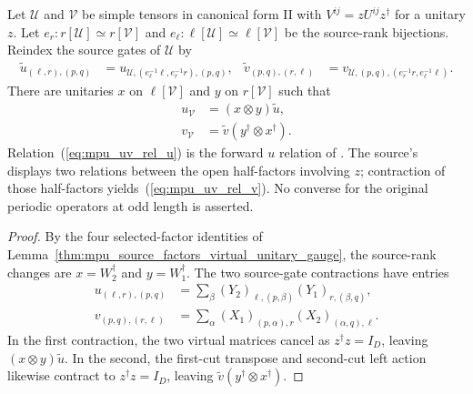 \begin{lemma}
    \label{thm:mpu_source_gates_virtual_unitary_gauge}
    \leanok
    Let $\mathcal U$ and $\mathcal V$ be simple tensors in canonical form II
    with $V^{ij}=zU^{ij}z^\dagger$ for a unitary $z$. Let
    $e_r:r[\mathcal U]\simeq r[\mathcal V]$ and
    $e_\ell:\ell[\mathcal U]\simeq\ell[\mathcal V]$ be the source-rank
    bijections. Reindex the source gates of $\mathcal U$ by
    \begin{align}
        \widetilde u_{(\ell,r),(p,q)}
         & =u_{\mathcal U,(e_\ell^{-1}\ell,e_r^{-1}r),(p,q)},
         & \widetilde v_{(p,q),(r,\ell)}
         & =v_{\mathcal U,(p,q),(e_r^{-1}r,e_\ell^{-1}\ell)}.
    \end{align}
    There are unitaries $x$ on $\ell[\mathcal V]$ and $y$ on
    $r[\mathcal V]$ such that
    \begin{align}
        u_{\mathcal V} & =(x\otimes y)\widetilde u,
        \label{eq:mpu_uv_rel_u}                                     \\
        v_{\mathcal V} & =\widetilde v(y^\dagger\otimes x^\dagger).
        \label{eq:mpu_uv_rel_v}
    \end{align}
    Relation~(\ref{eq:mpu_uv_rel_u}) is the forward $u$ relation of
    \cite[Equation~(SFuu)]{Cirac2017MPU}. The source's
    \cite[Equation~(SFvv)]{Cirac2017MPU} displays two relations between the
    open half-factors involving $z$; contraction of those half-factors yields~(\ref{eq:mpu_uv_rel_v}). No converse for the original periodic
    operators at odd length is asserted.
\end{lemma}

\begin{proof}\leanok
    By the four selected-factor identities of
    Lemma~\ref{thm:mpu_source_factors_virtual_unitary_gauge}, the
    source-rank changes are $x=W_2^\dagger$ and $y=W_1^\dagger$. The
    two source-gate contractions have entries
    \begin{align}
        u_{(\ell,r),(p,q)}
         & =\sum_\beta (Y_2)_{\ell,(p,\beta)}(Y_1)_{r,(\beta,q)},    \\
        v_{(p,q),(r,\ell)}
         & =\sum_\alpha (X_1)_{(p,\alpha),r}(X_2)_{(\alpha,q),\ell}.
    \end{align}
    In the first contraction, the two virtual matrices cancel as
    $z^\dagger z=I_D$, leaving $(x\otimes y)\widetilde u$. In the second,
    the first-cut transpose and second-cut left action likewise contract
    to $z^\dagger z=I_D$, leaving
    $\widetilde v(y^\dagger\otimes x^\dagger)$.
\end{proof}

